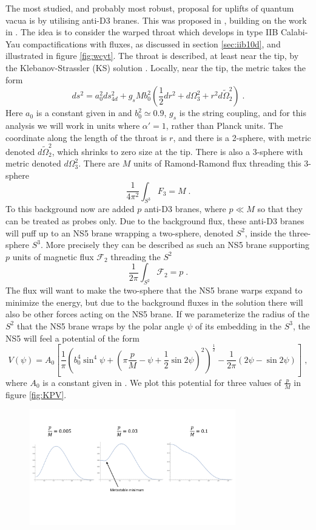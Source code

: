 \documentclass[11pt,a4paper]{article}
\numberwithin{equation}{section}
\numberwithin{table}{section}\setlength{\multlinegap}{25pt}
\newcommand{\cF}{\mathcal{F}}
\newcommand{\be}{\begin{equation}}
\newcommand{\ee}{\end{equation}}
\begin{document}
{The most studied, and probably most robust, proposal for uplifts of quantum vacua is by utilising anti-D3 branes. This was proposed in \cite{Kachru:2003aw}, building on the work in \cite{Kachru:2002gs}. The idea is to consider the warped throat which develops in type IIB Calabi-Yau compactifications with fluxes, as discussed in section \ref{sec:iib10d}, and illustrated in figure \ref{fig:wcyt}. The throat is described, at least near the tip, by the Klebanov-Strassler (KS) solution \cite{Klebanov:2000hb}. Locally, near the tip, the metric takes the form \cite{Herzog:2001xk,Kachru:2002gs}
\be
ds^2 = a_0^2 ds^2_{4d} + g_s M b_0^2 \left( \frac12 dr^2 + d\Omega_3^2 + r^2 d\tilde{\Omega}_2^2 \right) \;.
\ee
Here $a_0$ is a constant given in \cite{Kachru:2002gs} and $b^2_0\simeq 0.9$, $g_s$ is the string coupling, and for this analysis we will work in units where $\alpha'=1$, rather than Planck units. The coordinate along the length of the throat is $r$, and there is a 2-sphere, with metric denoted $d\tilde{\Omega}_2^2$, which shrinks to zero size at the tip. There is also a 3-sphere with metric denoted $d\Omega_3^2$. There are $M$ units of Ramond-Ramond flux threading this 3-sphere
\be
\frac{1}{4 \pi^2}\int_{S^3} F_3 =  M \;.
\ee
To this background now are added $p$ anti-D3 branes, where $p \ll M$ so that they can be treated as probes only. Due to the background flux, these anti-D3 branes will puff up to an NS5 brane wrapping a two-sphere, denoted $S^2$, inside the three-sphere $S^3$. More precisely they can be described as such an NS5 brane supporting $p$ units of magnetic flux $\cF_2$ threading the $S^2$ 
\be
\frac{1}{2\pi} \int_{S^2} \cF_2 = p \;.
\ee
The flux will want to make the two-sphere that the NS5 brane warps expand to minimize the energy, but due to the background fluxes in the solution there will also be other forces acting on the NS5 brane. If we parameterize the radius of the $S^2$ that the NS5 brane wraps by the polar angle $\psi$ of its embedding in the $S^3$, the NS5 will feel a potential of the form \cite{Kachru:2002gs}
\be
V\left( \psi \right) = A_0 \left[ \frac{1}{\pi} \left( b_0^4 \sin^4 \psi + \left(\pi \frac{p}{M}-\psi+\frac12 \sin 2\psi \right)^2\right)^{\frac12} - \frac{1}{2\pi} \left(2 \psi - \sin 2 \psi \right) \right]\;,
\label{kpvpot}
\ee
where $A_0$ is a constant given in \cite{Kachru:2002gs}. We plot this potential for three values of $\frac{p}{M}$ in figure \ref{fig:KPV}. 
\begin{figure}[t]
\centering
 \includegraphics[width=0.8\textwidth]{KPV.pdf}

\end{figure}}
\end{document}
